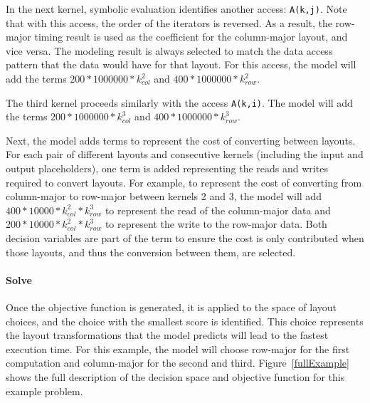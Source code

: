 In the next kernel, symbolic evaluation identifies another access: \verb.A(k,j)..
Note that with this access, the order of the iterators is reversed. 
As a result, the row-major timing result is used as the coefficient for the column-major layout, and vice versa.
The modeling result is always selected to match the data access pattern that the data would have for that layout.
For this access, the model will add the terms $200 * 1000000 * k_{col}^2$ and $400 * 1000000 * k_{row}^2$.

The third kernel proceeds similarly with the access \verb.A(k,i)..
The model will add the terms $200 * 1000000 * k_{col}^3$ and $400 * 1000000 * k_{row}^3$.

Next, the model adds terms to represent the cost of converting between layouts. 
For each pair of different layouts and consecutive kernels (including the input and output placeholders), one term is added representing the reads and writes required to convert layouts.
For example, to represent the cost of converting from column-major to row-major between kernels 2 and 3, the model will add $400 * 10000 * k_{col}^2 * k_{row}^3$ to represent the read of the column-major data and $200 * 10000 * k_{col}^2 * k_{row}^3$ to represent the write to the row-major data.
Both decision variables are part of the term to ensure the cost is only contributed when those layouts, and thus the conversion between them, are selected.

\paragraph{Solve}
Once the objective function is generated, it is applied to the space of layout choices, and the choice with the smallest score is identified.
This choice represents the layout transformations that the model predicts will lead to the fastest execution time.
For this example, the model will choose row-major for the first computation and column-major for the second and third.
Figure~\ref{fullExample} shows the full description of the decision space and objective function for this example problem.

